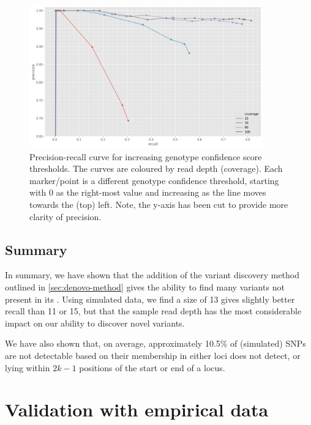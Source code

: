 \begin{figure}
    \centering
    \includegraphics[width=0.9\textwidth]{Chapter1/Figs/denovo-sims-roc.png}
    \caption{Precision-recall curve for increasing genotype confidence score thresholds. The curves are coloured by read depth (coverage). Each marker/point is a different genotype confidence threshold, starting with 0 as the right-most value and increasing as the line moves towards the (top) left. Note, the y-axis has been cut to provide more clarity of precision.}
    \label{fig:denovo-sims-roc}
\end{figure}

\subsection{Summary}

In summary, we have shown that the addition of the \denovo{} variant discovery method outlined in \autoref{sec:denovo-method} gives \pandora{} the ability to find many variants not present in its \panrg{}. Using simulated data, we find a \kmer{} size of 13 gives slightly better recall than 11 or 15, but that the sample read depth has the most considerable impact on our ability to discover novel variants.

We have also shown that, on average, approximately 10.5\% of (simulated) SNPs are not detectable based on their membership in either loci \pandora{} does not detect, or lying within $2k-1$ positions of the start or end of a locus.

\section{Validation with empirical data}
\label{sec:denovo-empirical}

